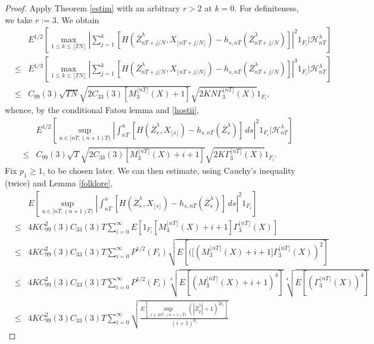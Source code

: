 \documentclass[a4paper,draft]{article}
\begin{document}
\begin{proof}
Apply Theorem \ref{estim} with an arbitrary $r>2$ at $k=0$. For definiteness, we take $r:=3$. We obtain
\begin{eqnarray*}
& & E^{1/2}\left[\max_{1\leq k\leq \lfloor TN\rfloor}\left\vert\sum_{j=1}^k
[H(\overline{Z}^{\lambda}_{nT+j/N},X_{\lfloor nT+j/N\rfloor})-h_{s,nT}(\overline{Z}^{\lambda}_{nT+j/N})]
\right\vert^{2} 1_{F_i} \vert \mathcal{H}_{nT}^{\lambda}\right]\\ &\leq&
E^{1/3}\left[\max_{1\leq k\leq \lfloor TN\rfloor}\left\vert\sum_{j=1}^k
[H(\overline{Z}^{\lambda}_{nT+j/N},X_{\lfloor nT+j/N\rfloor})-h_{s,nT}(\overline{Z}^{\lambda}_{nT+j/N})]
\right\vert^{3} 1_{F_i} \vert \mathcal{H}_{nT}^{\lambda}\right]\\ &\leq&
C_{99}(3)\sqrt{TN}\sqrt{2C_{33}(3)[M^{\lfloor nT\rfloor}_{3}(X)+1]}
\sqrt{2KN\Gamma^{\lfloor nT\rfloor}_{3}(X)}1_{F_i}, 
\end{eqnarray*}
whence, by the conditional Fatou lemma and \eqref{hostii},
\begin{eqnarray*}
& & E^{1/2}\left[\sup_{u\in [nT,(n+1)T)}\left\vert\int_{nT}^u
[H(\overline{Z}^{\lambda}_s,X_{\lfloor s\rfloor})-h_{s,nT}(\overline{Z}^{\lambda}_s)]
\, ds\right\vert^{2}1_{F_i}\vert\mathcal{H}_{nT}^{\lambda}\right]\\ &\leq&
C_{99}(3)\sqrt{T}\sqrt{2{C}_{33}(3)[M^{\lfloor nT\rfloor}_{3}(X)+i+1]}\sqrt{2K\Gamma^{\lfloor nT\rfloor}_{3}(X)}1_{F_i}.
\end{eqnarray*} Fix $p_1\geq 1$, to be chosen later.
We can then estimate, using Cauchy's inequality (twice) and Lemma \ref{folklore},
\begin{eqnarray*}
& & E\left[\sup_{u\in [nT,(n+1)T)}\left\vert\int_{nT}^u
[H(\overline{Z}^{\lambda}_s,X_{\lfloor s\rfloor})-h_{s,nT}(\overline{Z}^{\lambda}_s)]
\, ds\right\vert^{2}1_{F_i}\right]\\ &\leq&
4KC_{99}^2(3)C_{33}(3){T}\sum_{i=0}^{\infty}E\left[1_{F_i}
[M^{\lfloor nT\rfloor}_{3}(X)+i+1]\Gamma^{\lfloor nT\rfloor}_{3}(X)
\right]\\ 
&\leq& 4KC^2_{99}(3)C_{33}(3)T\sum_{i=0}^{\infty}P^{1/2}(F_i)
\sqrt{E\left[([(M^{\lfloor nT\rfloor}_{3}(X)+i+1]\Gamma^{\lfloor nT\rfloor}_{3}(X))^2\right]}\\
&\leq& 4KC^2_{99}(3) C_{33}(3)T\sum_{i=0}^{\infty}P^{1/2}(F_i)
\sqrt[4]{E[(M^{\lfloor nT\rfloor}_{3}(X)+i+1)^4]}\sqrt[4]{E[(\Gamma^{\lfloor nT\rfloor}_{3}(X))^4]}\\
&\leq& 4KC^2_{99}(3)C_{33}(3){T}\sum_{i=0}^{\infty}
\sqrt{\frac{E\left[\sup_{s\in [nT,(n+1)T)}(|\overline{Z}^{\lambda}_{y}|+1)^{2p_1}\right]}{(i+1)^{p_1}}}

\end{eqnarray*}
\end{proof}
\end{document}
